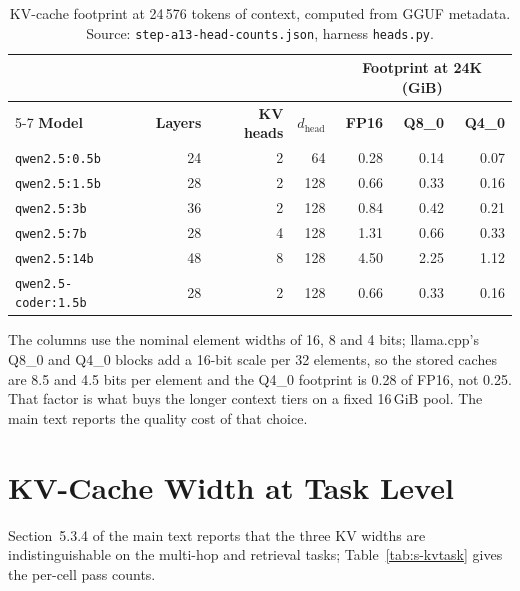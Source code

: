 \documentclass[11pt,a4paper]{article}
\begin{document}
\begin{table}[h]
\centering\small
\caption{KV-cache footprint at 24\,576 tokens of context, computed from
GGUF metadata.  Source: \texttt{step-a13-head-counts.json}, harness
\texttt{heads.py}.}
\label{tab:s-kvfoot}
\begin{tabular}{@{}lrrrrrr@{}}
\toprule
& & & & \multicolumn{3}{c}{\textbf{Footprint at 24K (GiB)}} \\
\cmidrule(l){5-7}
\textbf{Model} & \textbf{Layers} & \textbf{KV heads} & \textbf{$d_{\text{head}}$}
  & \textbf{FP16} & \textbf{Q8\_0} & \textbf{Q4\_0} \\
\midrule
\texttt{qwen2.5:0.5b}       & 24 & 2 &  64 & 0.28 & 0.14 & 0.07 \\
\texttt{qwen2.5:1.5b}       & 28 & 2 & 128 & 0.66 & 0.33 & 0.16 \\
\texttt{qwen2.5:3b}         & 36 & 2 & 128 & 0.84 & 0.42 & 0.21 \\
\texttt{qwen2.5:7b}         & 28 & 4 & 128 & 1.31 & 0.66 & 0.33 \\
\texttt{qwen2.5:14b}        & 48 & 8 & 128 & 4.50 & 2.25 & 1.12 \\
\texttt{qwen2.5-coder:1.5b} & 28 & 2 & 128 & 0.66 & 0.33 & 0.16 \\
\bottomrule
\end{tabular}
\end{table}

The columns use the nominal element widths of 16, 8 and 4 bits;
llama.cpp's Q8\_0 and Q4\_0 blocks add a 16-bit scale per 32 elements,
so the stored caches are 8.5 and 4.5 bits per element and the Q4\_0
footprint is 0.28 of FP16, not 0.25.  That factor is what buys the
longer context tiers on a fixed 16\,GiB pool.  The main
text reports the quality cost of that choice.

\section{KV-Cache Width at Task Level}

Section~5.3.4 of the main text reports that the three KV widths are
indistinguishable on the multi-hop and retrieval tasks;
Table~\ref{tab:s-kvtask} gives the per-cell pass counts.
\end{document}
